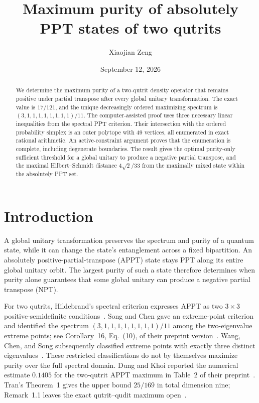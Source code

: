 \documentclass[aps,pra,onecolumn,notitlepage,10pt,amsmath,amssymb,longbibliography,nofootinbib]{revtex4-2}
\begin{document}
\title{Maximum purity of absolutely PPT states of two qutrits}
\author{Xiaojian Zeng}
\date{September 12, 2026}
\begin{abstract}
We determine the maximum purity of a two-qutrit density operator that remains
positive under partial transpose after every global unitary transformation.
The exact value is $17/121$, and the unique decreasingly ordered maximizing
spectrum is $(3,1,1,1,1,1,1,1,1)/11$.
The computer-assisted proof uses three necessary linear inequalities from the
spectral PPT criterion. Their intersection with the ordered probability simplex
is an outer polytope with 49 vertices, all enumerated in exact rational arithmetic.
An active-constraint argument proves that the enumeration is complete, including
degenerate boundaries. The result gives the optimal purity-only sufficient
threshold for a global unitary to produce a negative partial transpose, and the
maximal Hilbert--Schmidt distance $4\sqrt{2}/33$ from the maximally mixed state
within the absolutely PPT set.
\end{abstract}
\maketitle

\section{Introduction}

A global unitary transformation preserves the spectrum and purity of a quantum
state, while it can change the state's entanglement across a fixed bipartition.
An absolutely positive-partial-transpose (APPT) state stays PPT along its entire
global unitary orbit. The largest purity of such a state therefore determines
when purity alone guarantees that some global unitary can produce a negative
partial transpose (NPT).

For two qutrits, Hildebrand's spectral criterion expresses APPT as two
$3\times3$ positive-semidefinite conditions~\cite{Hildebrand}.
Song and Chen gave an extreme-point criterion and identified the spectrum
$(3,1,1,1,1,1,1,1,1)/11$ among the two-eigenvalue extreme points; see Corollary~16,
Eq.~(10), of their preprint version~\cite{SongChen}.
Wang, Chen, and Song subsequently classified extreme points with exactly three
distinct eigenvalues~\cite{WangChenSong}. These restricted classifications do not
by themselves maximize purity over the full spectral domain.
Dung and Khoi reported the numerical estimate $0.1405$ for the two-qutrit APPT
maximum in Table~2 of their preprint~\cite{DungKhoi}.
Tran's Theorem~1 gives the upper bound $25/169$ in total dimension nine;
Remark~1.1 leaves the exact qutrit--qudit maximum open~\cite{Tran}.
\end{document}

